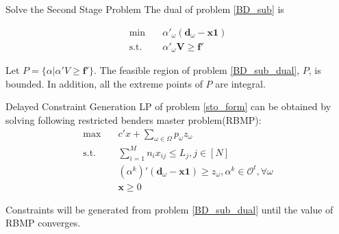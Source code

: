 \begin{frame}{Solve the Second Stage Problem}
  The dual of problem \eqref{BD_sub} is

  \begin{equation}\label{BD_sub_dual}
    \begin{aligned}
      \min \quad & \alpha{'}_{\omega} (\mathbf{d}_{\omega}- \mathbf{x} \mathbf{1}) \\
      \text {s.t.} \quad & \alpha{'}_{\omega} \mathbf{V} \geq \mathbf{f}{'}
    \end{aligned}
    \end{equation}

    Let $P = \{\alpha|\alpha{'}V \geq \mathbf{f}{'}\}$. 
    The feasible region of problem \eqref{BD_sub_dual}, $P$, is bounded. In addition, all the extreme points of $P$ are integral.
\end{frame}

\begin{frame}{Delayed Constraint Generation}
  LP of problem \eqref{sto_form} can be obtained by solving following restricted benders master problem(RBMP):
  \begin{equation}\label{BD_master2}
    \begin{aligned}
      \max \quad & c{'} x + \sum_{\omega \in \Omega} p_{\omega} z_{\omega} \\
      \text {s.t.} \quad & \sum_{i=1}^{M} n_{i} x_{ij} \leq L_j, j \in [N] \\
      & (\alpha^{k}){'}(\mathbf{d}_{\omega}- \mathbf{x} \mathbf{1}) \geq z_{\omega}, \alpha^k \in \mathcal{O}^{t}, \forall \omega \\
       & \mathbf{x} \geq 0
    \end{aligned}
  \end{equation} 

  Constraints will be generated from problem \eqref{BD_sub_dual} until the value of RBMP converges.
\end{frame}

